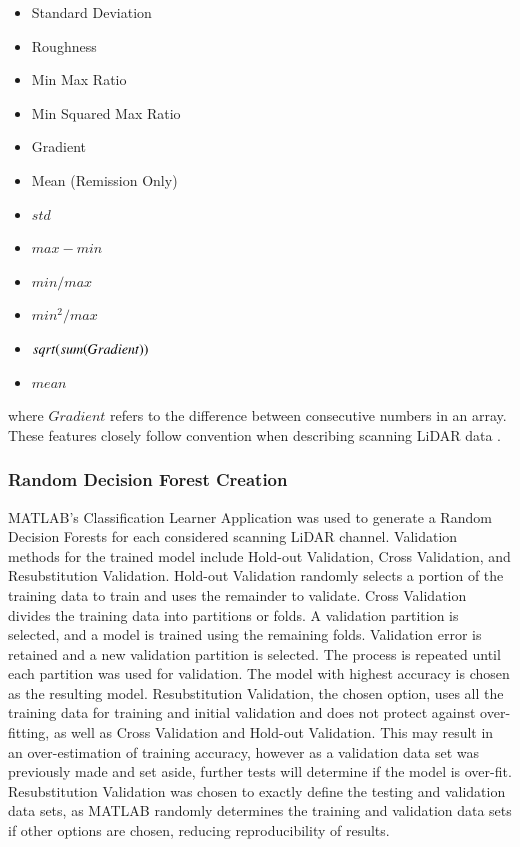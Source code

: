 \documentclass[numbered,pdftex]{ohio-etd}
\begin{document}
{{{{				\begin{multicols}{2}
					\begin{itemize}[itemsep=1pt]
						\item Standard Deviation
						\item Roughness
						\item Min Max Ratio
						\item Min Squared Max Ratio
						\item Gradient
						\item Mean (Remission Only)
					\end{itemize}
					\vfill\null
					\columnbreak
					\begin{itemize}[itemsep=1pt]
						\item $std$
						\item $max - min$
						\item $min / max$
						\item $min^2 / max$
						\item $sqrt(sum(Gradient\*))$
						\item $mean$
					\end{itemize}
					\vfill\null
					\label{lst:feature_list}
				\end{multicols}
			
				{where $Gradient$ refers to the difference between consecutive numbers in an array. These features closely follow convention when describing scanning LiDAR data \cite{breiman_random_2001}.}
			
			\newpage
				
			} %
			
			\subsubsection{Random Decision Forest Creation}\label{sec:random-decision-forest-creation}{
				
				{MATLAB's Classification Learner Application was used to generate a Random Decision Forests for each considered scanning LiDAR channel. Validation methods for the trained model include Hold-out Validation, Cross Validation, and Resubstitution Validation. Hold-out Validation randomly selects a portion of the training data to train and uses the remainder to validate. Cross Validation divides the training data into partitions or folds. A validation partition is selected, and a model is trained using the remaining folds. Validation error is retained and a new validation partition is selected. The process is repeated until each partition was used for validation. The model with highest accuracy is chosen as the resulting model. Resubstitution Validation, the chosen option, uses all the training data for training and initial validation and does not protect against over-fitting, as well as Cross Validation and Hold-out Validation. This may result in an over-estimation of training accuracy, however as a validation data set was previously made and set aside, further tests will determine if the model is over-fit. Resubstitution Validation was chosen to exactly define the testing and validation data sets, as MATLAB randomly determines the training and validation data sets if other options are chosen, reducing reproducibility of results.}
				
}}}}
\end{document}

